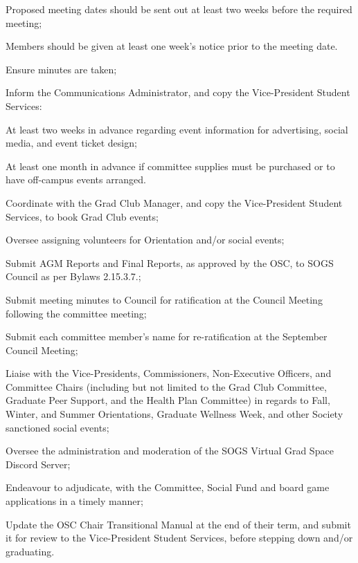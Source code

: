 \begin{longenum}[ label*=\thesubsection.\arabic*., align=left]
\begin{longenum}[label*=\arabic*., align=left]
\begin{longenum}[label*=\arabic*., align=left]
\begin{longenum}[label*=\arabic*., align=left]
				\item Proposed meeting dates should be sent out at least two weeks before the required meeting;
				\item Members should be given at least one week's notice prior to the meeting date.
				\end{longenum}	
			\item Ensure minutes are taken;
			\item Inform the Communications Administrator, and copy the Vice-President Student Services:
				\begin{longenum}[label*=\arabic*., align=left]
				\item At least two weeks in advance regarding event information for advertising, social media, and event ticket design;
				\item At least one month in advance if committee supplies must be purchased or to have off-campus events arranged.
				\end{longenum}	
			\item Coordinate with the Grad Club Manager, and copy the Vice-President Student Services, to book Grad Club events;
			\item Oversee assigning volunteers for Orientation and/or social events;
			\item Submit AGM Reports and Final Reports, as approved by the OSC, to SOGS Council as per Bylaws 2.15.3.7.;
			\item Submit meeting minutes to Council for ratification at the Council Meeting following the committee meeting;
			\item Submit each committee member's name for re-ratification at the September Council Meeting;							
			\item Liaise with the Vice-Presidents, Commissioners, Non-Executive Officers, and Committee Chairs (including but not limited to the Grad Club Committee, Graduate Peer Support, and the Health Plan Committee) in regards to Fall, Winter, and Summer Orientations, Graduate Wellness Week, and other Society sanctioned social events;			
			\item Oversee the administration and moderation of the SOGS Virtual Grad Space Discord Server;			
			\item Endeavour to adjudicate, with the Committee, Social Fund and board game applications in a timely manner;			
			\item Update the OSC Chair Transitional Manual at the end of their term, and submit it for review to the Vice-President Student Services, before stepping down and/or graduating.						

\end{longenum}
\end{longenum}
\end{longenum}
